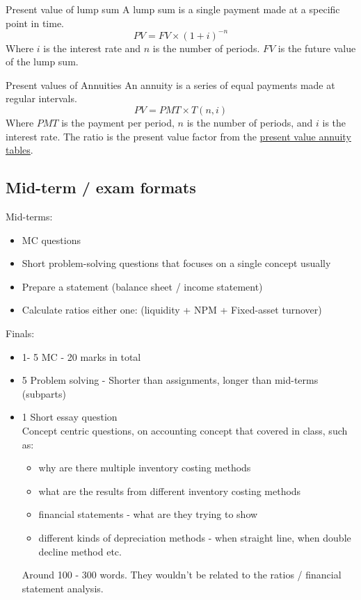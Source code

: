 \begin{theorem}
    {Present value of lump sum}
    A lump sum is a single payment made at a specific point in time.
    \[PV = FV \times (1+i)^{-n}\]
    Where $i$ is the interest rate and $n$ is the number of periods. $FV$ is the future value of the lump sum.
\end{theorem}

\begin{theorem}
    {Present values of Annuities}
    An annuity is a series of equal payments made at regular intervals.
    \[PV = PMT \times T(n, i)\]
    Where $PMT$ is the payment per period,
    $n$ is the number of periods, and
    $i$ is the interest rate.
    The ratio is the present value factor from the \href{https://www.double-entry-bookkeeping.com/wp-content/uploads/present-value-annuity-tables-v-1.0.jpg}{present value annuity tables}.
\end{theorem}

\subsection{Mid-term / exam formats}

Mid-terms:
\begin{itemize}
    \item MC questions
    \item Short problem-solving questions that focuses on a single concept usually
    \item Prepare a statement (balance sheet / income statement)
    \item Calculate ratios either one: (liquidity + NPM + Fixed-asset turnover)
\end{itemize}

Finals:
\begin{itemize}
    \item 1- 5 MC - 20 marks in total
    \item 5 Problem solving - Shorter than assignments, longer than mid-terms (subparts)
    \item 1 Short essay question\\
          Concept centric questions, on accounting concept that covered in class, such as:
          \begin{itemize}
              \item why are there multiple inventory costing methods
              \item what are the results from different inventory costing methods
              \item financial statements - what are they trying to show
              \item different kinds of depreciation methods - when straight line, when double decline method etc.
          \end{itemize}
          Around 100 - 300 words. They wouldn't be related to the ratios / financial statement analysis.
\end{itemize}
